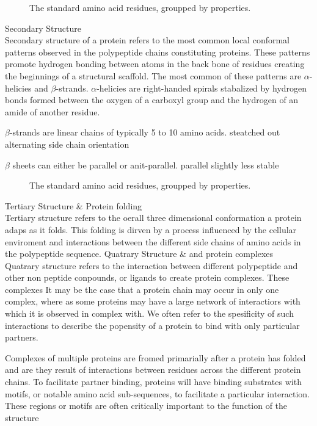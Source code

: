 \begin{figure}[ht] %
    \centering
    \caption{The standard amino acid residues, groupped by properties.}
    \label{fig:AA-prop}
\end{figure}


Secondary Structure\\
Secondary structure of a protein refers to the most common local conformal patterns observed in the polypeptide chains constituting proteins. These patterns promote hydrogen bonding between atoms in the back bone of residues creating the beginnings of a structural scaffold.
The most common of these patterns are $\alpha$-helicies and $\beta$-strands. 
$\alpha$-helicies are right-handed spirals stabalized by hydrogen bonds formed between the oxygen of a carboxyl group and the hydrogen of an amide of another residue.

$\beta$-strands are linear chains of typically 5 to 10 amino acids. 
steatched out
alternating side chain orientation

$\beta$ sheets
can either be parallel or anit-parallel.
parallel slightly less stable
\begin{figure}[ht] %
    \centering
    \caption{The standard amino acid residues, groupped by properties.}
    \label{fig:secondary-struct}
\end{figure}

Tertiary Structure \& Protein folding\\
Tertiary structure refers to the oerall three dimensional conformation a protein adaps as it folds. This folding is dirven by a process influenced by the cellular enviroment and interactions between the different side chains of amino acids in the polypeptide sequence.
Quatrary Structure \& and protein complexes\\
Quatrary structure refers to the interaction between different polypeptide and other non peptide conpounds, or ligands to create protein complexes. 
These complexes 
It may be the case that a protein chain may occur in only one complex, where as some proteins may have a large network of interactiors with which it is observed in complex with.
We often refer to the spesificity of such interactions to describe the popensity of a protein to bind with only particular partners.

Complexes of multiple proteins are fromed primarially after a protein has folded and are they result of interactions between residues across the different protein chains.
To facilitate partner binding, proteins will have binding substrates with motifs, or notable amino acid sub-sequences, to facilitate a particular interaction. 
These regions or motifs are often critically important to the function of the structure 

